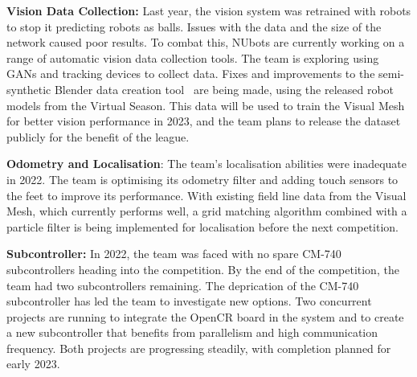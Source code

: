 \documentclass{llncs}
\begin{document}




\noindent\textbf{Vision Data Collection:}
Last year, the vision system was retrained with robots to stop it predicting robots as balls. Issues with the data and the size of the network caused poor results. To combat this, NUbots are currently working on a range of automatic vision data collection tools. The team is exploring using GANs and tracking devices to collect data. Fixes and improvements to the semi-synthetic Blender data creation tool~\cite{nubotsNUpbrGit} are being made, using the released robot models from the Virtual Season. This data will be used to train the Visual Mesh~\cite{Houliston2018VisualMR} for better vision performance in 2023, and the team plans to release the dataset publicly for the benefit of the league.\newline 

\noindent\textbf{Odometry and Localisation}:
The team's localisation abilities were inadequate in 2022. The team is optimising its odometry filter and adding touch sensors to the feet to improve its performance. With existing field line data from the Visual Mesh, which currently performs well, a grid matching algorithm combined with a particle filter is being implemented for localisation before the next competition.\newline

\noindent\textbf{Subcontroller:}
In 2022, the team was faced with no spare CM-740 subcontrollers heading into the competition. By the end of the competition, the team had two subcontrollers remaining. The deprication of the CM-740 subcontroller has led the team to investigate new options. Two concurrent projects are running to integrate the OpenCR board in the system and to create a new subcontroller that benefits from parallelism and high communication frequency. Both projects are progressing steadily, with completion planned for early 2023.\newline
\end{document}

